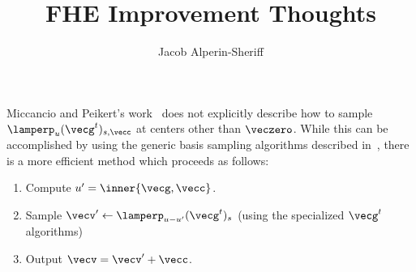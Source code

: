 \documentclass[oribibl,envcountsect,envcountsame]{llncs}
\title{FHE Improvement Thoughts}
\author{%
  Jacob Alperin-Sheriff
}
\institute{NIST
  \email{jacob.alperin-sheriff@nist.gov}
}
\begin{document}

\maketitle
\thispagestyle{plain}
%  
%  
%





Miccancio and Peikert's work~\cite{DBLP:conf/eurocrypt/MicciancioP12}
does not explicitly describe how to sample $\lamperp_{u}(\vecg^{t})_{s,\vecc}$
at centers other than $\veczero$. While this can be accomplished by
using the generic basis sampling algorithms described
in~\cite{DBLP:conf/stoc/GentryPV08}, there is a more efficient method
which proceeds as follows:
\begin{enumerate}
\item Compute $u' = \inner{\vecg,\vecc}$. 
\item Sample $\vecv' \gets \lamperp_{u-u'}(\vecg^{t})_{s}$ (using the
  specialized $\vecg^t$ algorithms)
\item Output $\vecv=\vecv'+\vecc$. 
\end{enumerate}








\end{document}
